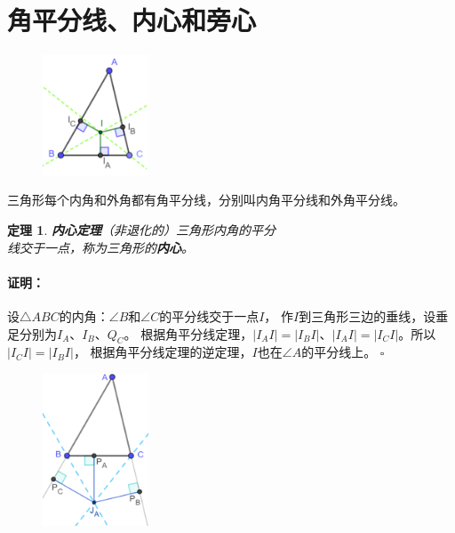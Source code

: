 \documentclass[12pt,UTF8]{ctexbook}
\newtheorem{tm}{定理}[section]
\newenvironment{proof2}{\paragraph{\textbf{证明：}}}{\hfill$\square$}
\begin{document}
\section{角平分线、内心和旁心}

\begin{figure} %
    \vspace{-40pt}
    \flushright
    \includegraphics[width=0.28\textwidth]{tu/三角形内心.png}
\end{figure}

三角形每个内角和外角都有角平分线，分别叫内角平分线和外角平分线。

\begin{tm}{\textbf{内心定理}}\label{tm:1-2-0}
    （非退化的）三角形内角的平分\\
    线交于一点，称为三角形的\textbf{内心}。
\end{tm}

\begin{proof2}
    设$\triangle ABC$的内角：$\angle B$和$\angle C$的平分线交于一点$I$，
    作$I$到三角形三边的垂线，设垂足分别为$I_A$、$I_B$、$Q_C$。
    根据角平分线定理，$|I_AI| = |I_BI|$、$|I_AI| = |I_CI|$。所以$|I_CI| = |I_BI|$，
    根据角平分线定理的逆定理，$I$也在$\angle A$的平分线上。
\end{proof2}

\begin{figure} %
    \vspace{-30pt}
    \flushright
    \includegraphics[width=0.28\textwidth]{tu/三角形旁心.png}
\end{figure}
\end{document}
